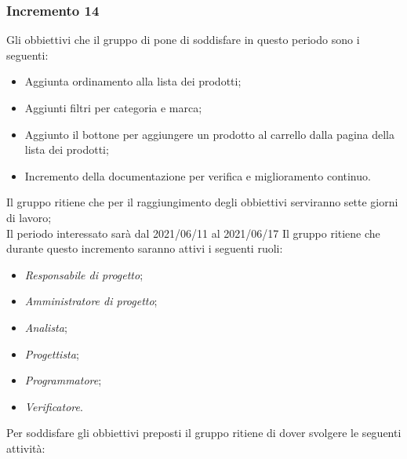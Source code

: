 \subsubsection{Incremento 14}
Gli obbiettivi che il gruppo di pone di soddisfare in questo periodo sono i seguenti:
\begin{itemize}
    \item Aggiunta ordinamento alla lista dei prodotti;
    \item Aggiunti filtri per categoria e marca;
    \item Aggiunto il bottone per aggiungere un prodotto al carrello dalla pagina della lista dei prodotti;
    \item Incremento della documentazione per verifica e miglioramento continuo.
\end{itemize}
Il gruppo ritiene che per il raggiungimento degli obbiettivi serviranno sette giorni di lavoro;\\
Il periodo interessato sarà dal 2021/06/11 al 2021/06/17
Il gruppo ritiene che durante questo incremento saranno attivi i seguenti ruoli:
\begin{itemize}
    \item \textit{Responsabile di progetto};
    \item \textit{Amministratore di progetto};
    \item \textit{Analista};
    \item \textit{Progettista};
    \item \textit{Programmatore};
    \item \textit{Verificatore}.
\end{itemize}
Per soddisfare gli obbiettivi preposti il gruppo ritiene di dover svolgere le seguenti attività:
